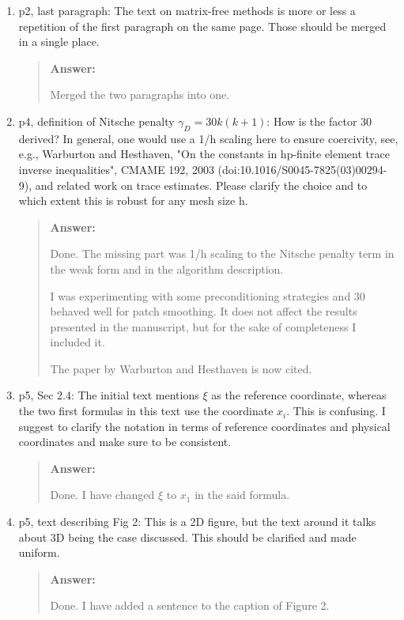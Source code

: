 \documentclass[11pt, a4paper]{article}
\newenvironment{answer}{%
      \begin{quote}%
            \color{blue!80!black}%
            \textbf{Answer:}%
            }{%
      \end{quote}%
}
\begin{document}
\begin{enumerate}[label=\textbullet, wide, labelindent=0pt]
      \item p2, last paragraph: The text on matrix-free methods is more or less a repetition of the first paragraph
            on the same page. Those should be merged in a single place.
            \begin{answer}
                  Merged the two paragraphs into one.
            \end{answer}

      \item p4, definition of Nitsche penalty \(\gamma_D = 30 k (k+1)\): How is the factor 30 derived? In general,
            one would use a 1/h scaling here to ensure coercivity, see, e.g., Warburton and Hesthaven, "On the
            constants
            in
            hp-ﬁnite element trace inverse inequalities", CMAME 192, 2003 (doi:10.1016/S0045-7825(03)00294-9), and
            related work on
            trace estimates. Please clarify the choice and to which extent this is robust for any mesh size h.
            \begin{answer}
                  Done. The missing part was 1/h scaling to the Nitsche penalty term in the weak form and in
                  the algorithm description.

                  I was experimenting with some preconditioning strategies and 30 behaved
                  well for patch smoothing. It does not affect the results presented in the manuscript, but for the
                  sake of completeness I included it.

                  The paper by Warburton and Hesthaven is now cited.
            \end{answer}

      \item p5, Sec 2.4: The initial text mentions \(\xi\) as the reference coordinate, whereas the two first
            formulas in this text use the coordinate \(x_i\). This is confusing. I suggest to clarify the notation in
            terms of
            reference coordinates and physical coordinates and make sure to be consistent.
            \begin{answer}
                  Done. I have changed \(\xi\) to \(x_1\) in the said formula.
            \end{answer}

      \item p5, text describing Fig 2: This is a 2D figure, but the text around it talks about 3D being the case
            discussed. This should be clarified and made uniform.
            \begin{answer}
                  Done. I have added a sentence to the caption of Figure 2.
            \end{answer}


\end{enumerate}
\end{document}
